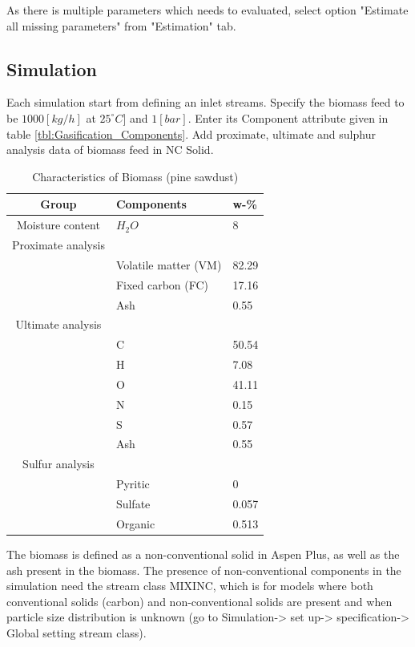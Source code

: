 As there is multiple parameters which needs to evaluated, select option "Estimate all missing parameters" from "Estimation" tab. 

\subsection{Simulation}

Each simulation start from defining an inlet streams. Specify the biomass feed to be $1000 [kg/h]$ at $25 ^\circ C]$ and $1 [bar]$. Enter its Component attribute given in table \ref{tbl:Gasification_Components}. Add proximate, ultimate and sulphur analysis data of biomass feed in NC Solid.

\begin{table}[h!]
	\centering
	\begin{tabular}{cll}
			\hline
			Group				&	Components				&	w-\% 	\\ \hline 
			Moisture content	&	$H_2O$					&	8		\\ \hline
			\multicolumn{1}{c}{Proximate analysis}&\\
			\cline{1-1}
								&	Volatile matter (VM)	& 	82.29	\\
								& 	Fixed carbon (FC) 		& 	17.16  	\\
								&	Ash 					& 	0.55	\\ \hline
			\multicolumn{1}{c}{Ultimate  analysis}&\\
			\cline{1-1}
								& 	C 						&	50.54	\\
								&	H 						& 	7.08	\\
								&	O 						& 	41.11 	\\
								&	N 						& 	0.15	\\
								&	S 						& 	0.57	\\
								&	Ash 					&	0.55	\\ \hline
			\multicolumn{1}{c}{Sulfur  analysis}&\\
			\cline{1-1}
								&		Pyritic 			& 0			\\
								&		Sulfate 			& 0.057		\\
								&		Organic 			& 0.513		\\
			\hline
	\end{tabular}
	\caption{Characteristics of Biomass (pine sawdust)}
	\label{tbl:Biomass_Composition}
\end{table}

The biomass is defined as a non-conventional solid in Aspen Plus, as well as the ash present in the biomass. The presence of non-conventional components in the simulation need the stream class MIXINC, which is for models where both conventional solids (carbon) and non-conventional solids are present and when particle size distribution is unknown (go to Simulation-> set up-> specification-> Global setting stream class). 

